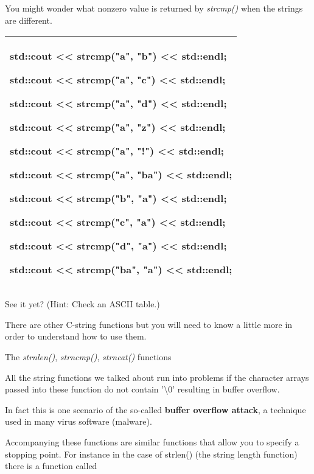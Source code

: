 \documentclass[
]{article}
\begin{document}
You might wonder what nonzero value is returned by \emph{strcmp()} when
the strings are different.

\begin{longtable}[]{@{}l@{}}
\toprule
\endhead
\begin{minipage}[t]{0.97\columnwidth}\raggedright
std::cout \textless\textless{} strcmp("a", "b") \textless\textless{}
std::endl;

std::cout \textless\textless{} strcmp("a", "c") \textless\textless{}
std::endl;

std::cout \textless\textless{} strcmp("a", "d") \textless\textless{}
std::endl;

std::cout \textless\textless{} strcmp("a", "z") \textless\textless{}
std::endl;

std::cout \textless\textless{} strcmp("a", "!") \textless\textless{}
std::endl;

std::cout \textless\textless{} strcmp("a", "ba") \textless\textless{}
std::endl;

std::cout \textless\textless{} strcmp("b", "a") \textless\textless{}
std::endl;

std::cout \textless\textless{} strcmp("c", "a") \textless\textless{}
std::endl;

std::cout \textless\textless{} strcmp("d", "a") \textless\textless{}
std::endl;

std::cout \textless\textless{} strcmp("ba", "a") \textless\textless{}
std::endl;\strut
\end{minipage}\tabularnewline
\bottomrule
\end{longtable}

See it yet? (Hint: Check an ASCII table.)

There are other C-string functions but you will need to know a little
more in order to understand how to use them.

The \emph{strnlen()}, \emph{strncmp()}, \emph{strncat()} functions

All the string functions we talked about run into problems if the
character arrays passed into these function do not contain
'\textbackslash0' resulting in buffer overflow.

In fact this is one scenario of the so-called \textbf{buffer overflow
attack}, a technique used in many virus software (malware).

Accompanying these functions are similar functions that allow you to
specify a stopping point. For instance in the case of strlen() (the
string length function) there is a function called
\end{document}
